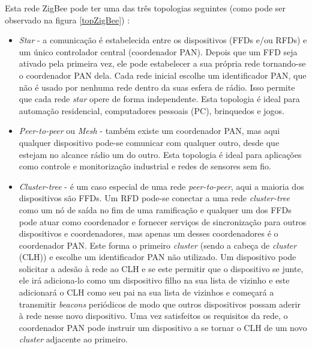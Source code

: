\documentclass[conference]{IEEEtran}
\begin{document}
Esta rede ZigBee pode ter uma das três topologias seguintes (como pode ser observado na figura \ref{topZigBee}) \cite{sinem2004zigbee}:

\begin{itemize}

 \item \textit{Star} - a comunicação é estabelecida entre os dispositivos (FFDs e/ou RFDs) e um único controlador central (coordenador PAN). Depois que um FFD seja ativado pela primeira vez, ele pode estabelecer a sua própria rede tornando-se o coordenador PAN dela. Cada rede inicial escolhe um identificador PAN, que não é usado por nenhuma rede dentro da suas esfera de rádio. Isso permite que cada rede \textit{star} opere de forma independente. Esta topologia é ideal para automação residencial, computadores pessoais (PC), brinquedos e jogos.
 
 \item \textit{Peer-to-peer} ou \textit{Mesh} - também existe um coordenador PAN, mas aqui qualquer dispositivo pode-se comunicar com qualquer outro, desde que estejam no alcance rádio um do outro. Esta topologia é ideal para aplicações como controle e monitorização industrial e redes de sensores sem fio. 
 
 \item \textit{Cluster-tree} - é um caso especial de uma rede \textit{peer-to-peer}, aqui a maioria dos dispositivos são FFDs. Um RFD pode-se conectar a uma rede \textit{cluster-tree} como um nó de saída no fim de uma ramificação e qualquer um dos FFDs pode atuar como coordenador e fornecer serviços de sincronização para outros dispositivos e coordenadores, mas apenas um desses coordenadores é o coordenador PAN. Este forma o primeiro \textit{cluster} (sendo a cabeça de \textit{cluster} (CLH)) e escolhe um identificador PAN não utilizado. Um dispositivo pode solicitar a adesão à rede ao CLH e se este permitir que o dispositivo se junte, ele irá adiciona-lo como um dispositivo filho na sua lista de vizinho e este adicionará o CLH como seu pai na sua lista de vizinhos e começará a transmitir \textit{beacons} periódicos de modo que outros dispositivos possam aderir à rede nesse novo dispositivo. Uma vez satisfeitos os requisitos da rede, o coordenador PAN pode instruir um dispositivo a se tornar o CLH de um novo \textit{cluster} adjacente ao primeiro. 

\end{itemize}


\end{document}
